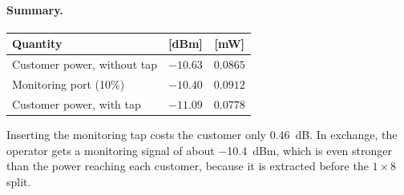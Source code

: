 \paragraph{Summary.}
\begin{center}
\begin{tabular}{lcc}
  \toprule
  Quantity & [dBm] & [mW] \\
  \midrule
  Customer power, without tap & $-10.63$ & $0.0865$ \\
  Monitoring port (10\%)       & $-10.40$ & $0.0912$ \\
  Customer power, with tap    & $-11.09$ & $0.0778$ \\
  \bottomrule
\end{tabular}
\end{center}
Inserting the monitoring tap costs the customer only \SI{0.46}{dB}.
In exchange, the operator gets a monitoring signal of about \SI{-10.4}{dBm}, which is even stronger than the
power reaching each customer, because it is extracted before the $1\times8$ split.
